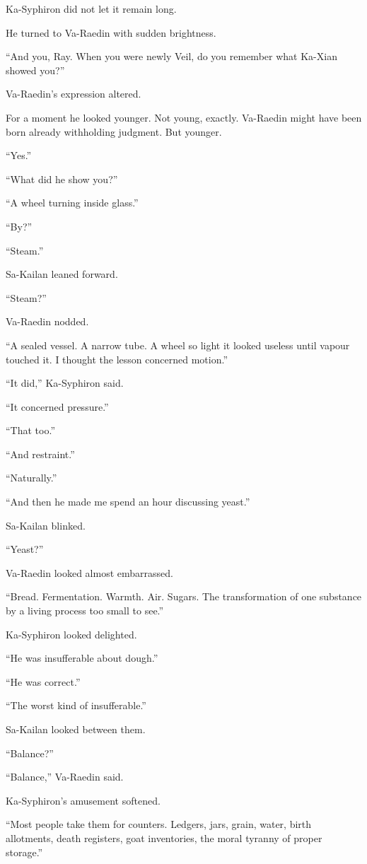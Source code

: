 Ka-Syphiron did not let it remain long.\par
He turned to Va-Raedin with sudden brightness.\par
“And you, Ray. When you were newly Veil, do you remember what Ka-Xian showed you?”\par
Va-Raedin’s expression altered.\par
For a moment he looked younger. Not young, exactly. Va-Raedin might have been born already withholding judgment. But younger.\par
“Yes.”\par
“What did he show you?”\par
“A wheel turning inside glass.”\par
“By?”\par
“Steam.”\par
Sa-Kailan leaned forward.\par
“Steam?”\par
Va-Raedin nodded.\par
“A sealed vessel. A narrow tube. A wheel so light it looked useless until vapour touched it. I thought the lesson concerned motion.”\par
“It did,” Ka-Syphiron said.\par
“It concerned pressure.”\par
“That too.”\par
“And restraint.”\par
“Naturally.”\par
“And then he made me spend an hour discussing yeast.”\par
Sa-Kailan blinked.\par
“Yeast?”\par
Va-Raedin looked almost embarrassed.\par
“Bread. Fermentation. Warmth. Air. Sugars. The transformation of one substance by a living process too small to see.”\par
Ka-Syphiron looked delighted.\par
“He was insufferable about dough.”\par
“He was correct.”\par
“The worst kind of insufferable.”\par
Sa-Kailan looked between them.\par
“Balance?”\par
“Balance,” Va-Raedin said.\par
Ka-Syphiron’s amusement softened.\par
“Most people take them for counters. Ledgers, jars, grain, water, birth allotments, death registers, goat inventories, the moral tyranny of proper storage.”\par

